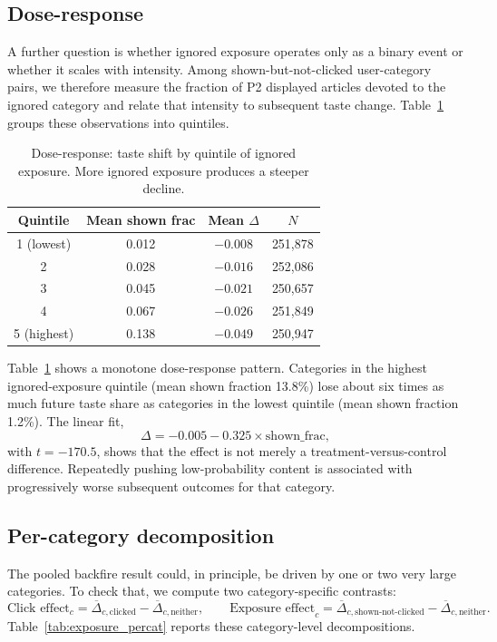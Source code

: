 \documentclass[11pt]{article}
\begin{document}
\subsection{Dose-response}

A further question is whether ignored exposure operates only as a binary event or whether it scales with intensity. Among shown-but-not-clicked user-category pairs, we therefore measure the fraction of P2 displayed articles devoted to the ignored category and relate that intensity to subsequent taste change. Table~\ref{tab:doseresponse} groups these observations into quintiles.

\begin{table}[ht]
\centering
\caption{Dose-response: taste shift by quintile of ignored exposure. More ignored exposure produces a steeper decline.}
\label{tab:doseresponse}
\begin{tabular}{cccc}
\toprule
Quintile & Mean shown frac & Mean $\Delta$ & $N$ \\
\midrule
1 (lowest) & 0.012 & $-0.008$ & 251,878 \\
2 & 0.028 & $-0.016$ & 252,086 \\
3 & 0.045 & $-0.021$ & 250,657 \\
4 & 0.067 & $-0.026$ & 251,849 \\
5 (highest) & 0.138 & $\mathbf{-0.049}$ & 250,947 \\
\bottomrule
\end{tabular}
\end{table}
\FloatBarrier

Table~\ref{tab:doseresponse} shows a monotone dose-response pattern. Categories in the highest ignored-exposure quintile (mean shown fraction 13.8\%) lose about six times as much future taste share as categories in the lowest quintile (mean shown fraction 1.2\%). The linear fit,
\[
\Delta = -0.005 - 0.325 \times \text{shown\_frac},
\]
with $t=-170.5$, shows that the effect is not merely a treatment-versus-control difference. Repeatedly pushing low-probability content is associated with progressively worse subsequent outcomes for that category.

\subsection{Per-category decomposition}

The pooled backfire result could, in principle, be driven by one or two very large categories. To check that, we compute two category-specific contrasts:
\[
\text{Click effect}_c
=
\overline{\Delta}_{c,\text{clicked}}
-
\overline{\Delta}_{c,\text{neither}},
\qquad
\text{Exposure effect}_c
=
\overline{\Delta}_{c,\text{shown-not-clicked}}
-
\overline{\Delta}_{c,\text{neither}}.
\]
Table~\ref{tab:exposure_percat} reports these category-level decompositions.
\end{document}
